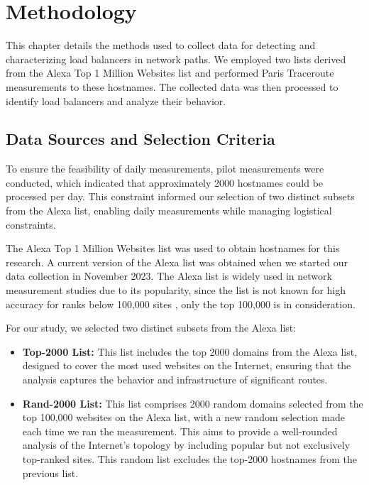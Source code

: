 \documentclass[12pt]{cwru_thesis}
\begin{document}
 

\chapter{Methodology}

This chapter details the methods used to collect data for detecting and characterizing load balancers in network paths. We employed two lists derived from the Alexa Top 1 Million Websites list and performed Paris Traceroute measurements to these hostnames. The collected data was then processed to identify load balancers and analyze their behavior.

\section{Data Sources and Selection Criteria}

To ensure the feasibility of daily measurements, pilot measurements were conducted, which indicated that approximately 2000 hostnames could be processed per day. This constraint informed our selection of two distinct subsets from the Alexa list, enabling daily measurements while managing logistical constraints.

The Alexa Top 1 Million Websites list was used to obtain hostnames for this research. A current version of the Alexa list was obtained when we started our data collection in November 2023. The Alexa list is widely used in network measurement studies due to its popularity, since the list is not known for high accuracy for ranks below 100,000 sites  \cite{alexa2023top1m}, only the top 100,000 is in consideration.

For our study, we selected two distinct subsets from the Alexa list:
\begin{itemize}
    \item \textbf{Top-2000 List:} This list includes the top 2000 domains from the Alexa list, designed to cover the most used websites on the Internet, ensuring that the analysis captures the behavior and infrastructure of significant routes.
    \item \textbf{Rand-2000 List:} This list comprises 2000 random domains selected from the top 100,000 websites on the Alexa list, with a new random selection made each time we ran the measurement. This aims to provide a well-rounded analysis of the Internet's topology by including popular but not exclusively top-ranked sites. This random list excludes the top-2000 hostnames from the previous list.
\end{itemize}
\end{document}
